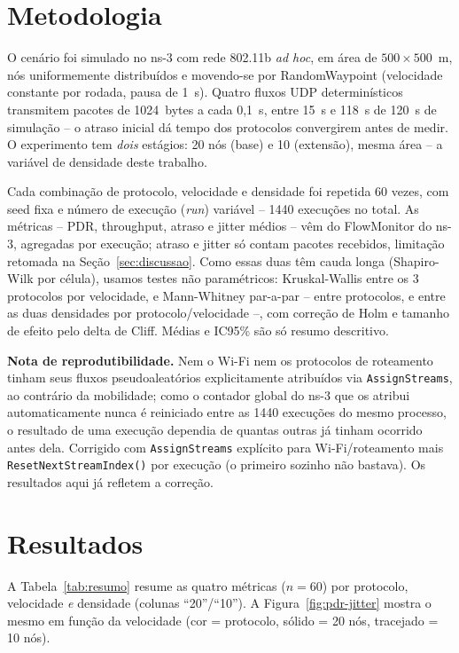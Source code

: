 \documentclass[12pt]{article}
\begin{document}
\section{Metodologia}

O cenário foi simulado no ns-3 com rede 802.11b \textit{ad hoc}, em área de $500\times500$~m, nós uniformemente distribuídos e movendo-se por RandomWaypoint (velocidade constante por rodada, pausa de 1~s). Quatro fluxos UDP determinísticos transmitem pacotes de 1024~bytes a cada 0,1~s, entre 15~s e 118~s de 120~s de simulação -- o atraso inicial dá tempo dos protocolos convergirem antes de medir. O experimento tem \emph{dois} estágios: 20 nós (base) e 10 (extensão), mesma área -- a variável de densidade deste trabalho.

Cada combinação de protocolo, velocidade e densidade foi repetida 60 vezes, com seed fixa e número de execução (\textit{run}) variável -- 1440 execuções no total. As métricas -- PDR, throughput, atraso e jitter médios -- vêm do FlowMonitor do ns-3, agregadas por execução; atraso e jitter só contam pacotes recebidos, limitação retomada na Seção~\ref{sec:discussao}. Como essas duas têm cauda longa (Shapiro-Wilk por célula), usamos testes não paramétricos: Kruskal-Wallis entre os 3 protocolos por velocidade, e Mann-Whitney par-a-par -- entre protocolos, e entre as duas densidades por protocolo/velocidade --, com correção de Holm e tamanho de efeito pelo delta de Cliff. Médias e IC95\% são só resumo descritivo.

\textbf{Nota de reprodutibilidade.} Nem o Wi-Fi nem os protocolos de roteamento tinham seus fluxos pseudoaleatórios explicitamente atribuídos via \texttt{AssignStreams}, ao contrário da mobilidade; como o contador global do ns-3 que os atribui automaticamente nunca é reiniciado entre as 1440 execuções do mesmo processo, o resultado de uma execução dependia de quantas outras já tinham ocorrido antes dela. Corrigido com \texttt{AssignStreams} explícito para Wi-Fi/roteamento mais \texttt{ResetNextStreamIndex()} por execução (o primeiro sozinho não bastava). Os resultados aqui já refletem a correção.

\section{Resultados}

A Tabela~\ref{tab:resumo} resume as quatro métricas ($n=60$) por protocolo, velocidade \emph{e} densidade (colunas ``20''/``10''). A Figura~\ref{fig:pdr-jitter} mostra o mesmo em função da velocidade (cor = protocolo, sólido = 20 nós, tracejado = 10 nós).
\end{document}
